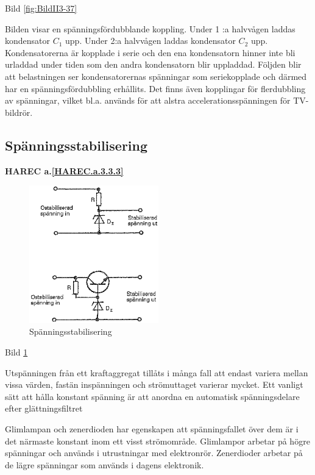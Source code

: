 Bild \ref{fig:BildII3-37}

Bilden visar en spänningsfördubblande koppling. Under 1 :a halvvågen
laddas kondensator \(C_1\) upp. Under 2:a halvvågen laddas kondensator
\(C_2\) upp. Kondensatorerna är kopplade i serie och den ena
kondensatorn hinner inte bli urladdad under tiden som den andra
kondensatorn blir uppladdad. Följden blir att belastningen ser
kondensatorernas spänningar som seriekopplade och därmed har en
spänningsfördubbling erhållits. Det finns även kopplingar för
flerdubbling av spänningar, vilket bl.a. används för att alstra
accelerationsspänningen för TV-bildrör.

\subsection{Spänningsstabilisering}
\textbf{HAREC a.\ref{HAREC.a.3.3.3}\label{myHAREC.a.3.3.3}}

\begin{figure}
\includegraphics[width=0.5\textwidth]{images/bild_2_3-38.png}
\caption{Spänningsstabilisering}
\label{fig:BildII3-38}
\end{figure}

Bild \ref{fig:BildII3-38}

Utspänningen från ett kraftaggregat tillåts i många fall att endast
variera mellan vissa värden, fastän inspänningen och strömuttaget
varierar mycket. Ett vanligt sätt att hålla konstant spänning är att
anordna en automatisk spänningsdelare efter glättningsfiltret

Glimlampan och zenerdioden har egenskapen att spänningsfallet över dem
är i det närmaste konstant inom ett visst strömområde. Glimlampor
arbetar på högre spänningar och används i utrustningar med
elektronrör. Zenerdioder arbetar på de lägre spänningar som används i
dagens elektronik.

